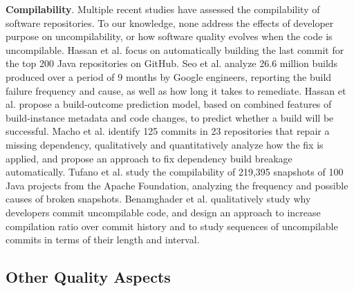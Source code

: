 \textbf{Compilability}.
Multiple recent studies \cite{8170083,Seo:2014:PBE:2568225.2568255,Hassan2017ESEM,macho2018automatically,SMR:SMR1838,Behnamghader_ESEM,Behnamghader_QRS} have assessed the compilability of software repositories. 
To our knowledge, none address the effects of developer purpose on uncompilability, or how software quality evolves when the code is uncompilable. 
Hassan et al. \cite{8170083} focus on automatically building the last commit for the top 200 Java repositories on GitHub.
Seo et al. \cite{Seo:2014:PBE:2568225.2568255} analyze 26.6 million builds produced over a period of 9 months by Google engineers, reporting the build failure frequency and cause, as well as how long it takes to remediate.
Hassan et al. \cite{Hassan2017ESEM} propose a build-outcome prediction model, based on combined features of build-instance metadata and code changes, to predict whether a build will be successful.
Macho et al. \cite{macho2018automatically} identify 125 commits in 23 repositories that repair a missing dependency, qualitatively and quantitatively analyze how the fix is applied, and propose an approach to fix dependency build breakage automatically.
Tufano et al. \cite{SMR:SMR1838} study the compilability of 219,395 snapshots of 100 Java projects from the Apache Foundation, analyzing the frequency and possible causes of broken snapshots.
Benamghader et al. \cite{Behnamghader_QRS} qualitatively study why developers commit uncompilable code, and design an approach \cite{Behnamghader_ESEM} to increase compilation ratio over commit history and to study sequences of uncompilable commits in terms of their length and interval.



\subsection{Other Quality Aspects}

